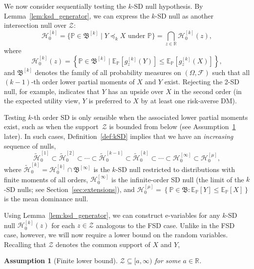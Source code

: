 \documentclass[12pt,twoside]{article}
\theoremstyle{plain}
\newtheorem{assumption}{Assumption}
\theoremstyle{definition}
\theoremstyle{remark}
\newcommand{\incurly}[1]{\left\{#1\right\}}
\newcommand{\R}{\mathbb{R}}
\newcommand{\calF}{\mathcal{F}}
\newcommand{\calH}{\mathcal{H}}
\newcommand{\calZ}{\mathcal{Z}}
\newcommand{\Esymb}{\mathbb{E}}
\newcommand{\Psymb}{\mathbb{P}}
\newcommand{\Ex}[2]{\Esymb_{{#1}}\left[{#2}\right]}
\newcommand{\frakB}{\mathfrak{B}}
\newcommand{\ksd}{\preceq_{k}}
\begin{document}
We now consider sequentially testing the $k$-SD null hypothesis. By Lemma~\ref{lem:ksd_generator}, we can express the $k$-SD null as another intersection null over $\calZ$:
\begin{equation}\label{eq:ksd_null}
    \calH_0^{[k]} = \{ \Psymb \in \frakB^{[k]} \mid Y \ksd X \text{ under } \Psymb\} = \bigcap_{z \in \R} \calH_0^{[k]}(z), 
\end{equation}
where
\begin{equation*}\label{eq:ksd_null_z}
    \calH_0^{[k]}(z) = \incurly{\Psymb \in \frakB^{[k]} \mid \Ex{\Psymb}{g_z^{[k]}(Y)} \leq \Ex{\Psymb}{g_z^{[k]}(X)}},
\end{equation*}
and $\frakB^{[k]}$ denotes the family of all probability measures on $(\Omega,\calF)$ such that all $(k-1)$-th order lower partial moments of $X$ and $Y$ exist. 
Rejecting the 2-SD null, for example, indicates that $Y$ has an upside over $X$ in the second order (in the expected utility view, $Y$ is preferred to $X$ by at least one risk-averse DM).


Testing $k$-th order SD is only sensible when the associated lower partial moments exist, such as when the support~$\calZ$ is bounded from below (see Assumption~\ref{assn:finite_lower_bound} later).
In such cases, Definition~\ref{def:kSD} implies that we have an \emph{increasing} sequence of nulls,
\begin{equation}\label{eq:ksd_relations}
    \tilde{\calH}_0^{[1]} \subset \tilde{\calH}_0^{[2]} \subset \dotsb \subset \tilde{\calH}_0^{[k-1]} \subset \tilde{\calH}_0^{[k]} \subset \dotsb \subset {\calH}_0^{[\infty]} \subset \calH_0^{[\mu]},
\end{equation}
where $\tilde{\calH}_0^{[k]} = \calH_0^{[k]} \cap \frakB^{[\infty]}$ is the $k$-SD null restricted to distributions with finite moments of all orders, $\calH_0^{[\infty]}$ is the infinite-order SD null (the limit of the $k$-SD nulls; see Section~\ref{sec:extensions}), and $\calH_0^{[\mu]} = \incurly{\Psymb \in \frakB: \Ex{\Psymb}{Y} \leq \Ex{\Psymb}{X}}$ is the mean dominance null. 

Using Lemma~\ref{lem:ksd_generator}, we can construct e-variables for any $k$-SD null $\calH_0^{[k]}(z)$ for each $z\in \calZ$ analogous to the FSD case. 
Unlike in the FSD case, however, we will now require a lower bound on the random variables. 
Recalling that $\calZ$ denotes the common support of $X$ and $Y$, 
\begin{assumption}[Finite lower bound]\label{assn:finite_lower_bound}
    $\calZ \subseteq [a, \infty)$ for some $a \in \R$. 
\end{assumption}
\end{document}
